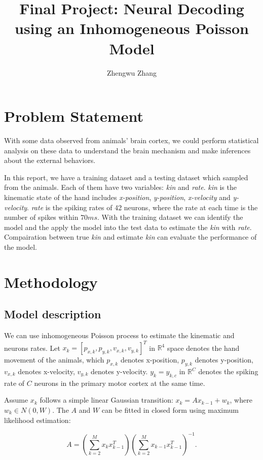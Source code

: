\documentclass[12pt,letterpaper]{article}
\newcommand{\real}{\ensuremath{\mathbb{R}}}
\begin{document}
\title{ Final Project: Neural Decoding using an Inhomogeneous Poisson Model}
\author{Zhengwu Zhang}
\maketitle
\thispagestyle{empty}
\section{Problem Statement}
With some data observed from animals' brain cortex, we could perform statistical analysis on these data to understand the brain mechanism and make inferences about the external behaviors. 

In this report, we have a training dataset and a testing dataset which sampled from the animals. Each of them have two variables: \textit{kin} and \textit{rate}. \textit{kin} is the kinematic state of the hand includes \textit{x-position}, \textit{y-position}, \textit{x-velocity} and \textit{y-velocity}. \textit{rate} is the spiking rates of 42 neurons, where the rate at each time is the number of spikes within $70ms$. With the training dataset we can identify the model and the apply the model into the test data to estimate the \textit{kin} with \textit{rate}. Compairation between true \textit{kin} and estimate \textit{kin} can evaluate the performance of the model. 

\section{Methodology}

\subsection{Model description}
We can use inhomogeneous Poisson process to estimate the kinematic and neurons rates. Let $x_k = [ p_{x,k}, p_{y,k},v_{x,k},v_{y,k} ]^T$ in $ \real^4 $ space denotes the hand movement of the animals, which $p_{x,k}$ denotes x-position, $ p_{y,k}$ denotes y-position, $v_{x,k}$ denotes x-velocity, $v_{y,k}$ denotes y-velocity. $y_k={y_{k,c}}$  in $\real^C$ denotes the spiking rate of $C$ neurons in the primary motor cortex at the same time. 

Assume $x_k$ follows a simple linear Gaussian transition: $x_k = A x_{k-1} + w_k$, where $w_k \in N(0,W)$. The $A$ and $W$ can be fitted in closed form using maximum likelihood estimation:

\begin{equation}
A = (\sum_{k=2}^{M}x_k x_{k-1}^T)(\sum_{k=2}^{M}x_{k-1}x_{k-1}^T)^{-1} .
\end{equation}
\end{document}

